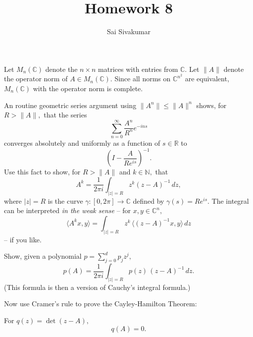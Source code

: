 \documentclass[12pt]{amsart}
\title{Homework 8}
\author{Sai Sivakumar}
\newcommand{\RR}{\mathbb{R}}
\newcommand{\NN}{\mathbb{N}}
\newcommand{\CC}{\mathbb{C}}
\begin{document}
\maketitle

\thispagestyle{empty}
 Let $M_n(\CC)$ denote the $n\times n$ matrices with entries
 from $\CC.$ Let  $\|A\|$ denote the operator norm of 
 $A\in M_n(\CC).$ Since all norms on $\CC^{n^2}$ are 
 equivalent, $M_n(\CC)$ with the operator norm is 
 complete. 

 An routine geometric series  argument using $\|A^n\|\le \|A\|^n$ 
 shows, for $R>\|A\|,$  that the series
\[
 \sum_{n=0}^\infty  \frac{A^n}{R^n} e^{-ins}
\]
 converges absolutely and uniformly as a function of $s\in \RR$  to 
\[
  (I- \frac{A}{Re^{is}})^{-1}.
\]
 Use this fact to show, for $R>\|A\|$ 
 and $k\in \NN,$ that 
\[ 
A^k= \frac{1}{2\pi i} \int_{|z|=R} z^k (z-A)^{-1} \, dz,
\]
where $|z|=R$ is the curve $\gamma:[0,2\pi]\to\CC$ 
defined by $\gamma(s)=Re^{is}.$ 
The integral can be interpreted {\it in the weak sense} -- 
  for $x,y\in \CC^n,$ 
\[
  \langle A^k x,y\rangle = \int_{|z|=R} z^k \, \langle (z-A)^{-1}x,y\rangle \, dz
\]
-- if you like. 
 
 Show, given a polynomial $p=\sum_{j=0}^d p_jz^j,$
\[
 p(A) =\frac{1}{2\pi i} \int_{|z|=R} p(z)\, (z-A)^{-1} \, dz.
\]
(This formula is then a version of Cauchy's integral formula.)


Now use Cramer's rule  to prove the Cayley-Hamilton Theorem:

For  $q(z)=\det(z-A),$ 
\[
  q(A)=0.
\]


\bigskip
\end{document}
